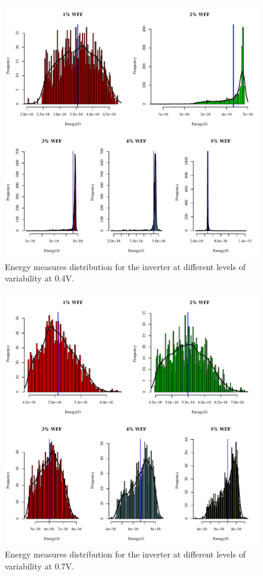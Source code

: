 \documentclass[pgmicro,mestrado,english]{iiufrgs}
\begin{document}
    \begin{figure}[]
        \centering
            \includegraphics[width=1\textwidth, trim={0cm 0cm 0cm 0cm}, clip]{dist_energy_INV_0_4.pdf}
            \caption{Energy measures distribution for the inverter at different levels of variability at 0.4V.}
        \label{fig:energyDist0_4}
    \end{figure}   
    
         \begin{figure}[]
        \centering
            \includegraphics[width=1\textwidth, trim={0cm 0cm 0cm 0cm}, clip]{dist_energy_INV_0_7.pdf}
            \caption{Energy measures distribution for the inverter at different levels of variability at 0.7V.}
        \label{fig:energyDist0_7}
    \end{figure}   
    
\end{document}

